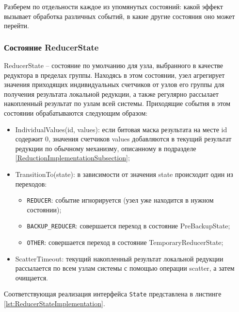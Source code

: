 \documentclass{article}
\theoremstyle{plain}
\theoremstyle{plain}
\theoremstyle{plain}
\theoremstyle{plain}
\theoremstyle{definition}
\theoremstyle{remark}
\theoremstyle{plain}
\begin{document}
Разберем по отдельности каждое из упомянутых состояний: какой эффект вызывает обработка различных событий, в какие другие состояния оно может перейти.

\subsubsection{Состояние ReducerState}

ReducerState -- состояние по умолчанию для узла, выбранного в качестве редуктора в пределах группы. Находясь в этом состоянии, узел агрегирует значения приходящих индивидуальных счетчиков от узлов его группы для получения результата локальной редукции, а также регулярно рассылает накопленный результат по узлам всей системы. Приходящие события в этом состоянии обрабатываются следующим образом:

\begin{itemize}
    \item IndividualValues(id, values): если битовая маска результата на месте id содержит $0$, значения счетчиков values добавляются в текущий результат редукции по обычному механизму, описанному в подразделе \ref{ReductionImplementationSubsection};
    
    \item TransitionTo(state): в зависимости от значения state происходит один из переходов:
        
        \begin{itemize}
            \item \texttt{REDUCER}: событие игнорируется (узел уже находится в нужном состоянии);
            \item \texttt{BACKUP\_REDUCER}: совершается переход в состояние PreBackupState;
            \item \texttt{OTHER}: совершается переход в состояние TemporaryReducerState;
        \end{itemize}
        
    \item ScatterTimeout: текущий накопленный результат локальной редукции рассылается по всем узлам системы с помощью операции scatter, а затем очищается.
\end{itemize}

Соответствующая реализация интерфейса \texttt{State} представлена в листинге \ref{lst:ReducerStateImplementation}.
\end{document}

